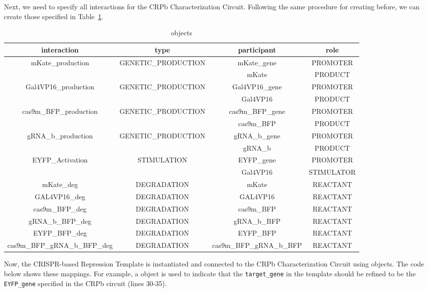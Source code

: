 Next, we need to specify all interactions for the CRPb Characterization Circuit. Following the same procedure for creating  before, we can create those specified in Table~\ref{tbl:tbl-Interaction}. 

\begin{table}[tb]
\caption{ objects}
\label{tbl:tbl-Interaction}
\centering
\begin{tabular}{c@{\hspace{1.5em}}c@{\hspace{1.5em}}c@{\hspace{1.5em}}c@{\hspace{1.5em}}}
\hline
interaction&
type&
participant&
role\\
\hline
\multirow{2}{*}{mKate\_production}&\multirow{2}{*}{GENETIC\_PRODUCTION}&mKate\_gene&PROMOTER\\
  &&mKate&PRODUCT\\ \hline %
\multirow{2}{*}{Gal4VP16\_production}&\multirow{2}{*}{GENETIC\_PRODUCTION}&Gal4VP16\_gene&PROMOTER\\
  &&Gal4VP16&PRODUCT\\ \hline %
\multirow{2}{*}{cas9m\_BFP\_production}&\multirow{2}{*}{GENETIC\_PRODUCTION}&cas9m\_BFP\_gene&PROMOTER\\
  &&cas9m\_BFP&PRODUCT\\ \hline %
\multirow{2}{*}{gRNA\_b\_production}&\multirow{2}{*}{GENETIC\_PRODUCTION}&gRNA\_b\_gene&PROMOTER\\
  &&gRNA\_b&PRODUCT\\ \hline %
\multirow{2}{*}{EYFP\_Activation}&\multirow{2}{*}{STIMULATION}&EYFP\_gene&PROMOTER\\
  &&Gal4VP16&STIMULATOR\\ \hline %
mKate\_deg&DEGRADATION&mKate&REACTANT\\ \hline%
GAL4VP16\_deg&DEGRADATION&GAL4VP16&REACTANT\\ \hline%
cas9m\_BFP\_deg&DEGRADATION&cas9m\_BFP&REACTANT\\ \hline%
gRNA\_b\_BFP\_deg&DEGRADATION&gRNA\_b\_BFP&REACTANT\\ \hline%
EYFP\_BFP\_deg&DEGRADATION&EYFP\_BFP&REACTANT\\ \hline%
cas9m\_BFP\_gRNA\_b\_BFP\_deg&DEGRADATION&cas9m\_BFP\_gRNA\_b\_BFP&REACTANT\\ \hline%
\end{tabular}
\end{table}

Now, the CRISPR-based Repression Template  is instantiated and connected to the CRPb Characterization Circuit using  objects. The code below shows these mappings.
For example, a  object is used to indicate that the \texttt{target\_gene} in the template should be refined to be the \texttt{EYFP\_gene} specified in the CRPb circuit (lines 30-35).  

